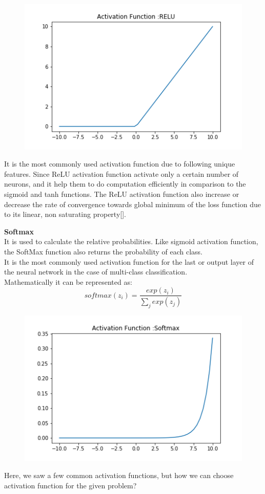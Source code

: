 \begin{figure}[H]
    \centering
    \includegraphics{Figures/RELU.png}
    \label{fig:my_label}
\end{figure}


It is the most commonly used activation  function due to following unique features. Since ReLU activation function activate only a certain number of neurons, and it help them to do computation efficiently  in comparison to the sigmoid and tanh functions. The ReLU activation function also increase or decrease the rate of convergence towards global minimum of the loss function due to its linear, non saturating property[\cite{21}].

\textbf{Softmax}\\
It is used to calculate the relative probabilities. Like sigmoid activation function, the SoftMax function also returns the probability of each class. \\
It is the most commonly used activation function for the last or output layer of the neural network in the case of multi-class classification. \\
Mathematically it can be represented as:
\begin{equation}
    softmax(z_i) = \frac{exp(z_i)}{\sum_j exp(z_j)}
\end{equation}
\begin{figure}[H]
    \centering
    \includegraphics{Figures/softmax.png}
    \label{fig:my_label}
\end{figure}
Here, we saw a few common activation functions, but how we can choose activation function for the given problem? 


